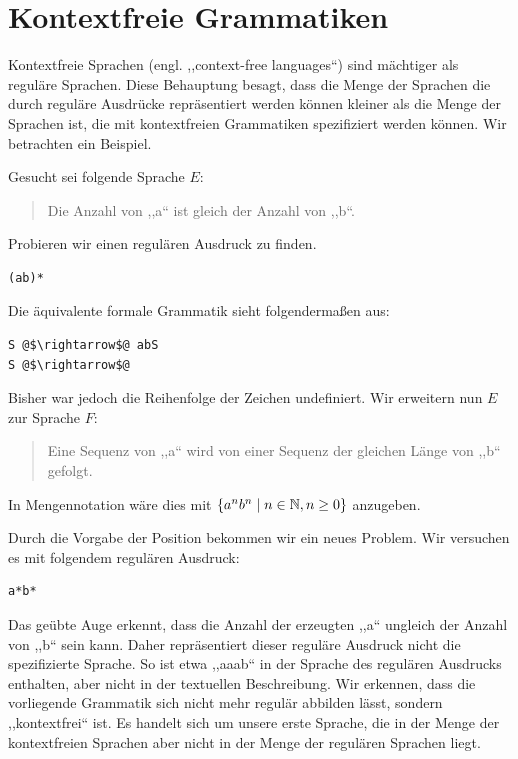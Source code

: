 \section{Kontextfreie Grammatiken}
%
Kontextfreie Sprachen (engl. ,,context-free languages``) sind mächtiger als reguläre Sprachen. Diese Behauptung besagt, dass die Menge der Sprachen die durch reguläre Ausdrücke repräsentiert werden können kleiner als die Menge der Sprachen ist, die mit kontextfreien Grammatiken spezifiziert werden können. Wir betrachten ein Beispiel.

Gesucht sei folgende Sprache $E$:
\begin{quote}
  Die Anzahl von ,,a`` ist gleich der Anzahl von ,,b``. 
\end{quote}

Probieren wir einen regulären Ausdruck zu finden.
\begin{lstlisting}
(ab)*
\end{lstlisting}

Die äquivalente formale Grammatik sieht folgendermaßen aus:
\begin{lstlisting}
S @$\rightarrow$@ abS
S @$\rightarrow$@
\end{lstlisting}

Bisher war jedoch die Reihenfolge der Zeichen undefiniert. Wir erweitern nun $E$ zur Sprache $F$:
\begin{quote}
  Eine Sequenz von ,,a`` wird von einer Sequenz der gleichen Länge von ,,b`` gefolgt.
\end{quote}
In Mengennotation wäre dies mit $\left\{a^n b^n \mid n \in \mathbb{N}, n \geq 0\right\}$ anzugeben.

Durch die Vorgabe der Position bekommen wir ein neues Problem. Wir versuchen es mit folgendem regulären Ausdruck:
\begin{lstlisting}
a*b*
\end{lstlisting}

Das geübte Auge erkennt, dass die Anzahl der erzeugten ,,a`` ungleich der Anzahl von ,,b`` sein kann. Daher repräsentiert dieser reguläre Ausdruck nicht die spezifizierte Sprache. So ist etwa ,,aaab`` in der Sprache des regulären Ausdrucks enthalten, aber nicht in der textuellen Beschreibung. Wir erkennen, dass die vorliegende Grammatik sich nicht mehr regulär abbilden lässt, sondern ,,kontextfrei`` ist. Es handelt sich um unsere erste Sprache, die in der Menge der kontextfreien Sprachen aber nicht in der Menge der regulären Sprachen liegt.

